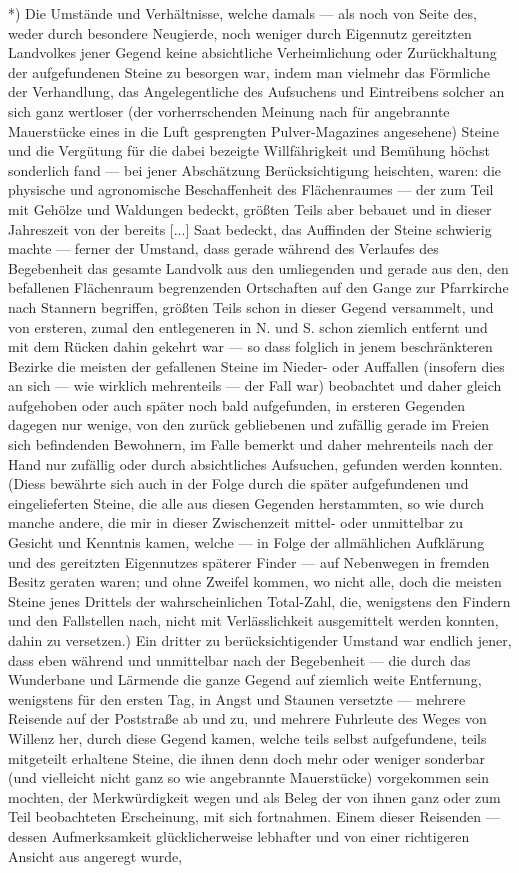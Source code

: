 \documentclass[a4paper, 11pt, oneside, german]{article}
\begin{document}
*) Die Umstände und Verhältnisse, welche damals --- als noch von Seite des, weder durch besondere Neugierde, noch weniger durch Eigennutz gereitzten Landvolkes jener Gegend keine absichtliche Verheimlichung oder Zurückhaltung der aufgefundenen Steine zu besorgen war, indem man vielmehr das Förmliche der Verhandlung, das Angelegentliche des Aufsuchens und Eintreibens solcher an sich ganz wertloser (der vorherrschenden Meinung nach für angebrannte Mauerstücke eines in die Luft gesprengten Pulver-Magazines angesehene) Steine und die Vergütung für die dabei bezeigte Willfährigkeit und Bemühung höchst sonderlich fand --- bei jener Abschätzung Berücksichtigung heischten, waren: die physische und agronomische Beschaffenheit des Flächenraumes --- der zum Teil mit Gehölze und Waldungen bedeckt, größten Teils aber bebauet und in dieser Jahreszeit von der bereits [...] Saat bedeckt, das Auffinden der Steine schwierig machte --- ferner der Umstand, dass gerade während des Verlaufes des Begebenheit das gesamte Landvolk aus den umliegenden und gerade aus den, den befallenen Flächenraum begrenzenden Ortschaften auf den Gange zur Pfarrkirche nach Stannern begriffen, größten Teils schon in dieser Gegend versammelt, und von ersteren, zumal den entlegeneren in N. und S. schon ziemlich entfernt und mit dem Rücken dahin gekehrt war --- so dass folglich in jenem beschränkteren Bezirke die meisten der gefallenen Steine im Nieder- oder Auffallen (insofern dies an sich --- wie wirklich mehrenteils --- der Fall war) beobachtet und daher gleich aufgehoben oder auch später noch bald aufgefunden, in ersteren Gegenden dagegen nur wenige, von den zurück gebliebenen und zufällig gerade im Freien sich befindenden Bewohnern, im Falle bemerkt und daher mehrenteils nach der Hand nur zufällig oder durch absichtliches Aufsuchen, gefunden werden konnten. (Diess bewährte sich auch in der Folge durch die später aufgefundenen und eingelieferten Steine, die alle aus diesen Gegenden herstammten, so wie durch manche andere, die mir in dieser Zwischenzeit mittel- oder unmittelbar zu Gesicht und Kenntnis kamen, welche --- in Folge der allmählichen Aufklärung und des gereitzten Eigennutzes späterer Finder --- auf Nebenwegen in fremden Besitz geraten waren; und ohne Zweifel kommen, wo nicht alle, doch die meisten Steine jenes Drittels der wahrscheinlichen Total-Zahl, die, wenigstens den Findern und den Fallstellen nach, nicht mit Verlässlichkeit ausgemittelt werden konnten, dahin zu versetzen.) Ein dritter zu berücksichtigender Umstand war endlich jener, dass eben während und unmittelbar nach der Begebenheit --- die durch das Wunderbane und Lärmende die ganze Gegend auf ziemlich weite Entfernung, wenigstens für den ersten Tag, in Angst und Staunen versetzte --- mehrere Reisende auf der Poststraße ab und zu, und mehrere Fuhrleute des Weges von Willenz her, durch diese Gegend kamen, welche teils selbst aufgefundene, teils mitgeteilt erhaltene Steine, die ihnen denn doch mehr oder weniger sonderbar (und vielleicht nicht ganz so wie angebrannte Mauerstücke) vorgekommen sein mochten, der Merkwürdigkeit wegen und als Beleg der von ihnen ganz oder zum Teil beobachteten Erscheinung, mit sich fortnahmen. Einem dieser Reisenden --- dessen Aufmerksamkeit glücklicherweise lebhafter und von einer richtigeren Ansicht aus angeregt wurde, 
\end{document}
